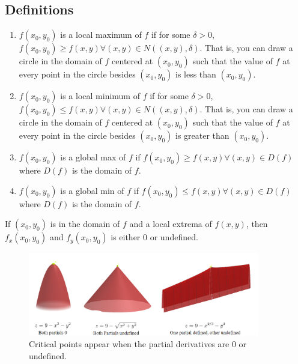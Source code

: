 \subsection{Definitions}
\begin{enumerate}
	\item $f(x_0, y_0)$ is a local maximum of $f$ if for some $\delta > 0$, $f(x_0, y_0) \geq f(x, y) \forall (x,y) \in N((x,y),\delta)$.
		That is, you can draw a circle in the domain of $f$ centered at $(x_0, y_0)$ such that the value of $f$ at every point in the circle besides $(x_0, y_0)$ is less than $(x_0, y_0)$.
	\item $f(x_0, y_0)$ is a local minimum of $f$ if for some $\delta > 0$, $f(x_0, y_0) \leq f(x,y) \forall (x,y) \in N((x,y),\delta)$.
		That is, you can draw a circle in the domain of $f$ centered at $(x_0, y_0)$ such that the value of $f$ at every point in the circle besides $(x_0, y_0)$ is greater than $(x_0, y_0)$.
	\item $f(x_0, y_0)$ is a global max of $f$ if $f(x_0, y_0) \geq f(x,y) \forall (x,y) \in D(f)$ where $D(f)$ is the domain of $f$.
	\item $f(x_0, y_0)$ is a global min of $f$ if $f(x_0, y_0) \leq f(x,y) \forall (x,y) \in D(f)$ where $D(f)$ is the domain of $f$.
\end{enumerate}
\begin{theorem}
	If $(x_0, y_0)$ is in the domain of $f$ and a local extrema of $f(x,y)$, then $f_x(x_0, y_0)$ and $f_y(x_0, y_0)$ is either 0 or undefined.
\end{theorem}

\begin{figure}[H]
	\centering
	\includegraphics[width=0.9\textwidth]{./Images/differentialMultivariableCalculus/optimization.png}
	\caption{Critical points appear when the partial derivatives are 0 or undefined.}
\end{figure}